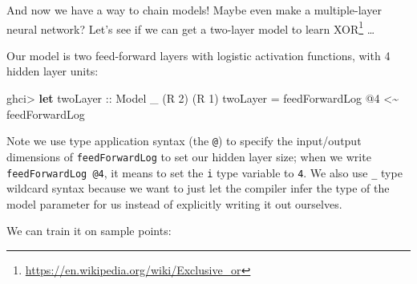 \documentclass[]{article}
\newenvironment{Shaded}{}{}
\newcommand{\DataTypeTok}[1]{\textcolor[rgb]{0.56,0.13,0.00}{#1}}
\newcommand{\DecValTok}[1]{\textcolor[rgb]{0.25,0.63,0.44}{#1}}
\newcommand{\FunctionTok}[1]{\textcolor[rgb]{0.02,0.16,0.49}{#1}}
\newcommand{\KeywordTok}[1]{\textcolor[rgb]{0.00,0.44,0.13}{\textbf{#1}}}
\newcommand{\NormalTok}[1]{#1}
\newcommand{\OperatorTok}[1]{\textcolor[rgb]{0.40,0.40,0.40}{#1}}
\newcommand{\OtherTok}[1]{\textcolor[rgb]{0.00,0.44,0.13}{#1}}
\renewcommand{\href}[2]{#2\footnote{\url{#1}}}
\begin{document}
And now we have a way to chain models! Maybe even make a multiple-layer neural
network? Let's see if we can get a two-layer model to learn
\href{https://en.wikipedia.org/wiki/Exclusive_or}{XOR} \ldots{}

Our model is two feed-forward layers with logistic activation functions, with 4
hidden layer units:

\begin{Shaded}
\begin{Highlighting}[]
\NormalTok{ghci}\OperatorTok{>} \KeywordTok{let}\OtherTok{ twoLayer ::} \DataTypeTok{Model}\NormalTok{ \_ (}\DataTypeTok{R} \DecValTok{2}\NormalTok{) (}\DataTypeTok{R} \DecValTok{1}\NormalTok{)}
\NormalTok{          twoLayer }\OtherTok{=}\NormalTok{ feedForwardLog\textquotesingle{} }\OperatorTok{@}\DecValTok{4} \OperatorTok{<\textasciitilde{}}\NormalTok{ feedForwardLog\textquotesingle{}}
\end{Highlighting}
\end{Shaded}

Note we use type application syntax (the \texttt{@}) to specify the input/output
dimensions of \texttt{feedForwardLog\textquotesingle{}} to set our hidden layer
size; when we write \texttt{feedForwardLog\textquotesingle{}\ @4}, it means to
set the \texttt{i} type variable to \texttt{4}. We also use \texttt{\_} type
wildcard syntax because we want to just let the compiler infer the type of the
model parameter for us instead of explicitly writing it out ourselves.

We can train it on sample points:

\begin{Shaded}
\end{Shaded}
\end{document}
